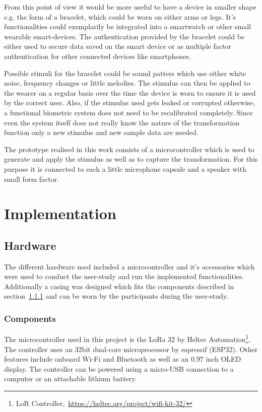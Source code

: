 From this point of view it would be more useful to have a device in smaller shape e.g. the form of a bracelet, which could be worn on either arms or legs.
It's functionalities could exemplarily be integrated into a smartwatch or other small wearable smart-devices. 
The authentication provided by the bracelet could be either used to secure data saved on the smart device or as multiple factor authentication for other connected devices like smartphones.

Possible stimuli for the bracelet could be sound patters which use either white noise, frequency changes or little melodies.
The stimulus can then be applied to the wearer on a regular basis over the time the device is worn to ensure it is used by the correct user.
Also, if the stimulus used gets leaked or corrupted otherwise, a functional biometric system does not need to be recalibrated completely.
Since even the system itself does not really know the nature of the transformation function only a new stimulus and new sample data are needed.

The prototype realised in this work consists of a microcontroller which is used to generate and apply the stimulus as well as to capture the transformation.
For this purpose it is connected to each a little microphone capsule and a speaker with small form factor.

\section{Implementation}

\subsection{Hardware}
The different hardware used included a microcontroller and it's accessories which were used to conduct the user-study and run the implemented functionalities.
Additionally a casing was designed which fits the components described in section~\ref{sssec::num1} and can be worn by the participants during the user-study.

\subsubsection{Components}\label{sssec::num1}
The microcontroller used in this project is the LoRa 32 by Heltec Automation\footnote{LoR Controller,~\url{https://heltec.org/project/wifi-kit-32/}}.
The controller uses an 32bit dual-core microprocessor by espressif (ESP32).
Other features include onboard Wi-Fi and Bluetooth as well as an 0.97 inch OLED display.
The controller can be powered using a micro-USB connection to a computer or an attachable lithium battery.

